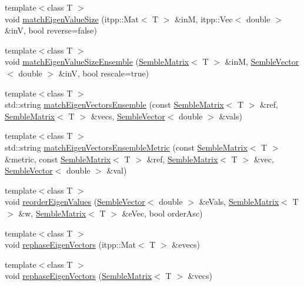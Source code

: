 \begin{DoxyCompactItemize}
{\footnotesize template$<$class T $>$ }\\void \mbox{\hyperlink{namespaceSEMBLE_ab4aa2c99272f76a558c7f98e0c27daba}{match\+Eigen\+Value\+Size}} (itpp\+::\+Mat$<$ T $>$ \&inM, itpp\+::\+Vec$<$ double $>$ \&inV, bool reverse=false)
\item 
{\footnotesize template$<$class T $>$ }\\void \mbox{\hyperlink{namespaceSEMBLE_ad811e95bd734c5aefb5b45cd80f49f87}{match\+Eigen\+Value\+Size\+Ensemble}} (\mbox{\hyperlink{structSEMBLE_1_1SembleMatrix}{Semble\+Matrix}}$<$ T $>$ \&inM, \mbox{\hyperlink{structSEMBLE_1_1SembleVector}{Semble\+Vector}}$<$ double $>$ \&inV, bool rescale=true)
\item 
{\footnotesize template$<$class T $>$ }\\std\+::string \mbox{\hyperlink{namespaceSEMBLE_ad6ce16294510dbd0badf0aa5cdbacbd6}{match\+Eigen\+Vectors\+Ensemble}} (const \mbox{\hyperlink{structSEMBLE_1_1SembleMatrix}{Semble\+Matrix}}$<$ T $>$ \&ref, \mbox{\hyperlink{structSEMBLE_1_1SembleMatrix}{Semble\+Matrix}}$<$ T $>$ \&vecs, \mbox{\hyperlink{structSEMBLE_1_1SembleVector}{Semble\+Vector}}$<$ double $>$ \&vals)
\item 
{\footnotesize template$<$class T $>$ }\\std\+::string \mbox{\hyperlink{namespaceSEMBLE_ac0296558b0b7cbba72850a107357a4ab}{match\+Eigen\+Vectors\+Ensemble\+Metric}} (const \mbox{\hyperlink{structSEMBLE_1_1SembleMatrix}{Semble\+Matrix}}$<$ T $>$ \&metric, const \mbox{\hyperlink{structSEMBLE_1_1SembleMatrix}{Semble\+Matrix}}$<$ T $>$ \&ref, \mbox{\hyperlink{structSEMBLE_1_1SembleMatrix}{Semble\+Matrix}}$<$ T $>$ \&vec, \mbox{\hyperlink{structSEMBLE_1_1SembleVector}{Semble\+Vector}}$<$ double $>$ \&val)
\item 
{\footnotesize template$<$class T $>$ }\\void \mbox{\hyperlink{namespaceSEMBLE_a688bf90b1c6ce1c1b6a28eb701eca973}{reorder\+Eigen\+Values}} (\mbox{\hyperlink{structSEMBLE_1_1SembleVector}{Semble\+Vector}}$<$ double $>$ \&e\+Vals, \mbox{\hyperlink{structSEMBLE_1_1SembleMatrix}{Semble\+Matrix}}$<$ T $>$ \&w, \mbox{\hyperlink{structSEMBLE_1_1SembleMatrix}{Semble\+Matrix}}$<$ T $>$ \&e\+Vec, bool order\+Asc)
\item 
{\footnotesize template$<$class T $>$ }\\void \mbox{\hyperlink{namespaceSEMBLE_a79d0a2c210a96269ba9cf04949eba1b8}{rephase\+Eigen\+Vectors}} (itpp\+::\+Mat$<$ T $>$ \&evecs)
\item 
{\footnotesize template$<$class T $>$ }\\void \mbox{\hyperlink{namespaceSEMBLE_ab6128a994eb0c94caa8452dfd476553f}{rephase\+Eigen\+Vectors}} (\mbox{\hyperlink{structSEMBLE_1_1SembleMatrix}{Semble\+Matrix}}$<$ T $>$ \&vecs)

\end{DoxyCompactItemize}
